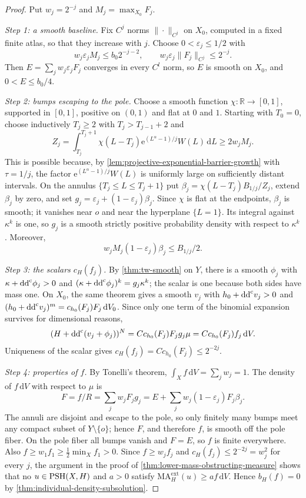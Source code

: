\begin{proof}
Put $w_j=2^{-j}$ and $M_j=\max_{X_0}F_j$.

\emph{Step 1: a smooth baseline.} Fix $C^j$ norms $\|\cdot\|_{C^j}$ on $X_0$, computed in a fixed finite atlas, so that they increase with $j$. Choose $0<\varepsilon_j\leq1/2$ with
\[
 w_j\varepsilon_jM_j\leq b_0 2^{-j-2},\qquad
 w_j\varepsilon_j\|F_j\|_{C^j}\leq2^{-j}.
\]
Then $E=\sum_jw_j\varepsilon_jF_j$ converges in every $C^l$ norm, so $E$ is smooth on $X_0$, and $0<E\leq b_0/4$.

\emph{Step 2: bumps escaping to the pole.} Choose a smooth function $\chi\colon\mathbb R\to[0,1]$, supported in $[0,1]$, positive on $(0,1)$ and flat at $0$ and $1$. Starting with $T_0=0$, choose inductively $T_j\geq2$ with $T_j>T_{j-1}+2$ and
\[
 Z_j=\int_{T_j}^{T_j+1}\chi(L-T_j)
       \mathrm e^{(L^\alpha-1)/j}W(L)\,\mathrm dL
       \geq2w_jM_j.
\]
This is possible because, by \cref{lem:projective-exponential-barrier-growth} with $\tau=1/j$, the factor $\mathrm e^{(L^\alpha-1)/j}W(L)$ is uniformly large on sufficiently distant intervals. On the annulus $\{T_j\leq L\leq T_j+1\}$ put $\beta_j=\chi(L-T_j)B_{1/j}/Z_j$, extend $\beta_j$ by zero, and set $g_j=\varepsilon_j+(1-\varepsilon_j)\beta_j$. Since $\chi$ is flat at the endpoints, $\beta_j$ is smooth; it vanishes near $o$ and near the hyperplane $\{L=1\}$. Its integral against $\kappa^k$ is one, so $g_j$ is a smooth strictly positive probability density with respect to $\kappa^k$. Moreover,
\[
 w_jM_j(1-\varepsilon_j)\beta_j\leq B_{1/j}/2.
\]

\emph{Step 3: the scalars $c_H(f_j)$.} By \cref{thm:tw-smooth} on $Y$, there is a smooth $\phi_j$ with $\kappa+\mathrm{dd}^{\mathrm{c}}\phi_j>0$ and $(\kappa+\mathrm{dd}^{\mathrm{c}}\phi_j)^k=g_j\kappa^k$; the scalar is one because both sides have mass one. On $X_0$, the same theorem gives a smooth $v_j$ with $h_0+\mathrm{dd}^{\mathrm{c}} v_j>0$ and $(h_0+\mathrm{dd}^{\mathrm{c}} v_j)^m=c_{h_0}(F_j)F_j\,\mathrm dV_0$. Since only one term of the binomial expansion survives for dimensional reasons,
\[
 (H+\mathrm{dd}^{\mathrm{c}}(v_j+\phi_j))^N
 =C c_{h_0}(F_j)F_jg_j\mu
 =C c_{h_0}(F_j)f_j\,\mathrm dV.
\]
Uniqueness of the scalar gives $c_H(f_j)=C c_{h_0}(F_j)\leq2^{-2j}$.

\emph{Step 4: properties of $f$.} By Tonelli's theorem, $\int_Xf\,\mathrm dV=\sum_jw_j=1$. The density of $f\,\mathrm{d}V$ with respect to $\mu$ is
\[
 F=f/R=\sum_jw_jF_jg_j=E+\sum_jw_j(1-\varepsilon_j)F_j\beta_j.
\]
The annuli are disjoint and escape to the pole, so only finitely many bumps meet any compact subset of $Y\setminus\{o\}$; hence $F$, and therefore $f$, is smooth off the pole fiber. On the pole fiber all bumps vanish and $F=E$, so $f$ is finite everywhere. Also $f\geq w_1f_1\geq\frac12\min_Xf_1>0$. Since $f\geq w_jf_j$ and $c_H(f_j)\leq2^{-2j}=w_j^2$ for every $j$, the argument in the proof of \cref{thm:lower-mass-obstructing-measure} shows that no $u\in\mathrm{PSH}(X,H)$ and $a>0$ satisfy $\mathrm{MA}^{\mathrm{ext}}_H(u)\geq af\,\mathrm{d}V$. Hence $b_H(f)=0$ by \cref{thm:individual-density-subsolution}.


\end{proof}
